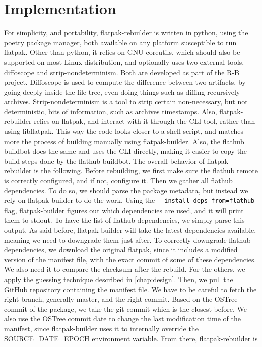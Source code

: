 \documentclass[a4paper,11pt,oneside]{report}
\theoremstyle{definition}
\newcommand{\sysname}{flatpak-rebuilder\xspace}
\newcommand{\fp}{flatpak\xspace}
\newcommand{\fh}{flathub\xspace}
\newcommand{\fb}{flatpak-builder\xspace}
\newcommand{\sde}{SOURCE\_DATE\_EPOCH\xspace}
\newcommand{\fhbb}{flathub buildbot\xspace}
\newcommand{\ot}{OSTree\xspace}
\begin{document}
\chapter{Implementation}
\label{chap:impl}

For simplicity, and portability, \sysname is written in python, using the poetry
package manager, both available on any platform susceptible to run \fp. Other
than python, it relies on GNU coreutils, which should also be supported on most
Linux distribution, and optionally uses two external tools, diffoscope and
strip-nondeterminism. Both are developed as part of the R-B project. Diffoscope
is used to compute the difference between two artifacts, by going deeply inside
the file tree, even doing things such as diffing recursively archives.
Strip-nondeterminism is a tool to strip certain non-necessary, but not
deterministic, bits of information, such as archives timestamps. Also, \sysname
relies on \fp, and interact with it through the CLI tool, rather than using
libflatpak. This way the code looks closer to a shell script, and matches more
the process of building manually using \fb. Also, the \fhbb does the same and
uses the CLI directly, making it easier to copy the build steps done by the
\fhbb. The overall behavior of \sysname is the following. Before rebuilding, we
first make sure the \fh remote is correctly configured, and if not, configure
it. Then we gather all \fh dependencies. To do so, we should parse the package
metadata, but instead we rely on \fb to do the work. Using the
\verb|--install-deps-from=flathub| flag, \fb figures out which dependencies are
used, and it will print them to stdout. To have the list of \fh dependencies,
we simply parse this output. As said before, \fb will take the latest
dependencies available, meaning we need to downgrade them just after. To
correctly downgrade \fh dependencies, we download the original \fp, since it
includes a modified version of the manifest file, with the exact commit of some
of these dependencies. We also need it to compare the checksum after the
rebuild. For the others, we apply the guessing technique described in
\autoref{chap:design}. Then, we pull the GitHub repository containing the
manifest file. We have to be careful to fetch the right branch, generally
master, and the right commit. Based on the \ot commit of the package, we
take the git commit which is the closest before. We also use the \ot commit
date to change the last modification time of the manifest, since \fb uses it to
internally override the \sde environment variable. From there, \sysname is
\end{document}
